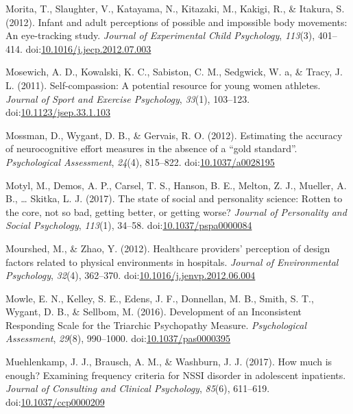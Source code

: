 \documentclass[english,man]{apa6}
\theoremstyle{definition}
\theoremstyle{definition}
\theoremstyle{definition}
\theoremstyle{remark}
\begin{document}
\hypertarget{ref-Morita2012}{}
Morita, T., Slaughter, V., Katayama, N., Kitazaki, M., Kakigi, R., \&
Itakura, S. (2012). Infant and adult perceptions of possible and
impossible body movements: An eye-tracking study. \emph{Journal of
Experimental Child Psychology}, \emph{113}(3), 401--414.
doi:\href{https://doi.org/10.1016/j.jecp.2012.07.003}{10.1016/j.jecp.2012.07.003}

\hypertarget{ref-Mosewich2011}{}
Mosewich, A. D., Kowalski, K. C., Sabiston, C. M., Sedgwick, W. a, \&
Tracy, J. L. (2011). Self-compassion: A potential resource for young
women athletes. \emph{Journal of Sport and Exercise Psychology},
\emph{33}(1), 103--123.
doi:\href{https://doi.org/10.1123/jsep.33.1.103}{10.1123/jsep.33.1.103}

\hypertarget{ref-Mossman2012}{}
Mossman, D., Wygant, D. B., \& Gervais, R. O. (2012). Estimating the
accuracy of neurocognitive effort measures in the absence of a ``gold
standard''. \emph{Psychological Assessment}, \emph{24}(4), 815--822.
doi:\href{https://doi.org/10.1037/a0028195}{10.1037/a0028195}

\hypertarget{ref-Motyl2017}{}
Motyl, M., Demos, A. P., Carsel, T. S., Hanson, B. E., Melton, Z. J.,
Mueller, A. B., \ldots{} Skitka, L. J. (2017). The state of social and
personality science: Rotten to the core, not so bad, getting better, or
getting worse? \emph{Journal of Personality and Social Psychology},
\emph{113}(1), 34--58.
doi:\href{https://doi.org/10.1037/pspa0000084}{10.1037/pspa0000084}

\hypertarget{ref-Mourshed2012}{}
Mourshed, M., \& Zhao, Y. (2012). Healthcare providers' perception of
design factors related to physical environments in hospitals.
\emph{Journal of Environmental Psychology}, \emph{32}(4), 362--370.
doi:\href{https://doi.org/10.1016/j.jenvp.2012.06.004}{10.1016/j.jenvp.2012.06.004}

\hypertarget{ref-Mowle2016}{}
Mowle, E. N., Kelley, S. E., Edens, J. F., Donnellan, M. B., Smith, S.
T., Wygant, D. B., \& Sellbom, M. (2016). Development of an Inconsistent
Responding Scale for the Triarchic Psychopathy Measure.
\emph{Psychological Assessment}, \emph{29}(8), 990--1000.
doi:\href{https://doi.org/10.1037/pas0000395}{10.1037/pas0000395}

\hypertarget{ref-Muehlenkamp2017}{}
Muehlenkamp, J. J., Brausch, A. M., \& Washburn, J. J. (2017). How much
is enough? Examining frequency criteria for NSSI disorder in adolescent
inpatients. \emph{Journal of Consulting and Clinical Psychology},
\emph{85}(6), 611--619.
doi:\href{https://doi.org/10.1037/ccp0000209}{10.1037/ccp0000209}
\end{document}
